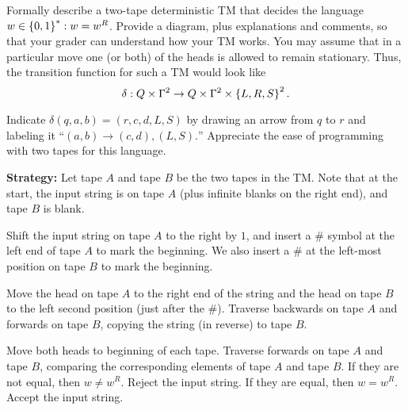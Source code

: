 \begin{problem}
  Formally describe a two-tape deterministic TM that decides the language
  ${w \in \left\{0,1\right\}^* : w = w^R}$.
  Provide a diagram, plus explanations and comments,
  so that your grader can understand how your TM works.
  You may assume that in a particular move one (or both)
  of the heads is allowed to remain stationary.
  Thus, the transition function for such a TM would look like
  \[ \delta : Q \times \Gamma^2 \to Q \times \Gamma^2 \times \left\{L, R, S\right\}^2. \]

  \step
  Indicate $\delta(q, a , b) = (r, c, d, L, S)$ by drawing an arrow from
  $q$ to $r$ and labeling it
  ``$(a, b) \to (c, d), (L, S).$''
  Appreciate the ease of programming with two tapes for this language.
\end{problem}
\begin{Answer}
  \textbf{Strategy:}
  Let tape $A$ and tape $B$ be the two tapes in the TM.
  Note that at the start, the input string is on tape $A$
  (plus infinite blanks on the right end), and tape $B$ is blank.

  \begin{enumroman}
    \item Shift the input string on tape $A$ to the right by $1$, and insert
      a $\#$ symbol at the left end of tape $A$ to mark the beginning.
      We also insert a $\#$ at the left-most position on tape $B$ to mark the beginning.

    \item Move the head on tape $A$ to the right end of the string
      and the head on tape $B$ to the left second position (just after the $\#$).
      Traverse backwards on tape $A$ and forwards on tape $B$,
      copying the string (in reverse) to tape $B$.
    \item Move both heads to beginning of each tape.
      Traverse forwards on tape $A$ and tape $B$,
      comparing the corresponding elements of tape $A$ and tape $B$.
      If they are not equal, then $w \neq w^R$. Reject the input string.
      If they are equal, then $w = w^R$. Accept the input string.
  \end{enumroman}

  \newpage
  \begin{figure}[H]
    \centering
\end{figure}
\end{Answer}

